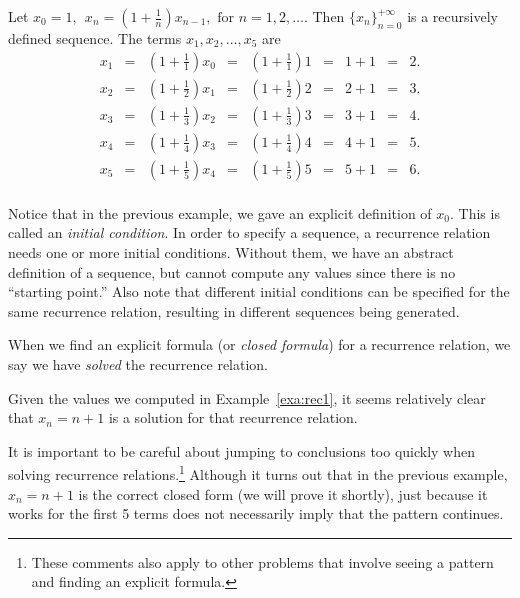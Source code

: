 \begin{exa}\label{exa:rec1}
Let $\displaystyle x_0 = 1,\ \  x_n = \left(1 + \frac{1}{n}\right)x_{n-1},\mbox{ for } n = 1, 2, \ldots .$ 
Then $\{x_n\}_{n = 0} ^{+\infty}$ is a 
recursively defined sequence. The terms $x_1, x_2, \ldots , x_5$ are
$$\begin{array}{lllllllll}
x_1 & = & \left(1 +\frac{1}{1}\right)x_0 &=& \left(1 +\frac{1}{1}\right)1 &= &1+1&= & 2. \\[1ex]
x_2 & = & \left(1 +\frac{1}{2}\right)x_1 &=& \left(1 +\frac{1}{2}\right)2 &= &2+1&= & 3. \\[1ex]
x_3 & = & \left(1 +\frac{1}{3}\right)x_2 &=& \left(1 +\frac{1}{3}\right)3 &= &3+1&= & 4. \\[1ex]
x_4 & = & \left(1 +\frac{1}{4}\right)x_3 &=& \left(1 +\frac{1}{4}\right)4 &= &4+1&= & 5. \\[1ex]
x_5 & = & \left(1 +\frac{1}{5}\right)x_4 &=& \left(1 +\frac{1}{5}\right)5 &= &5+1&= & 6. \\[1ex]
\end{array}
$$
\end{exa}


Notice that in the previous example, we gave an explicit definition of $x_0$.
This is called an {\em initial condition}.  In order to specify a 
sequence, a recurrence relation needs one or more initial conditions. 
Without them, we have an abstract definition of a sequence,
but cannot compute any values since there is no ``starting point.''
Also note that different initial conditions can be specified for the same
recurrence relation, resulting in different sequences being generated.

When we find an explicit formula (or {\em closed formula}) for a recurrence relation, 
we say we have {\em solved} the recurrence relation.

\begin{exa}
Given the values we computed in Example~\ref{exa:rec1}, 
it seems relatively clear that $x_n=n+1$ is a solution for that recurrence relation. 
\end{exa}

\begin{rem}
It is important to be careful about jumping to conclusions too quickly when solving
recurrence relations.\footnote{These comments also apply to other problems that involve seeing a
pattern and finding an explicit formula.}
Although it turns out that in the previous example, $x_n=n+1$ is the correct closed form
(we will prove it shortly),
just because it works for the first 5 terms does not necessarily imply that the pattern continues.
\end{rem}

